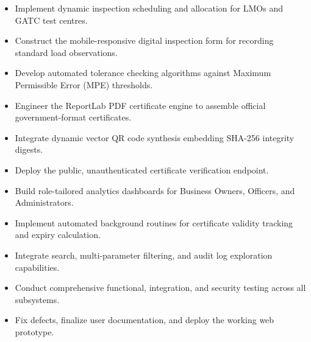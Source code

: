 \documentclass[11pt,a4paper]{article}
\begin{document}
\begin{tcolorbox}[enhanced, colback=white, colframe=primarynavy!40, boxrule=0.8pt, arc=2mm, title={\color{primarynavy}\textbf{Phase III: Verification, Scheduling \& Certification (Week 3)}}]
    \begin{itemize}
        \item Implement dynamic inspection scheduling and allocation for LMOs and GATC test centres.
        \item Construct the mobile-responsive digital inspection form for recording standard load observations.
        \item Develop automated tolerance checking algorithms against Maximum Permissible Error (MPE) thresholds.
        \item Engineer the ReportLab PDF certificate engine to assemble official government-format certificates.
        \item Integrate dynamic vector QR code synthesis embedding SHA-256 integrity digests.
        \item Deploy the public, unauthenticated certificate verification endpoint.
    \end{itemize}
\end{tcolorbox}

\begin{tcolorbox}[enhanced, colback=white, colframe=primarynavy!40, boxrule=0.8pt, arc=2mm, title={\color{primarynavy}\textbf{Phase IV: Dashboards, Notifications \& System Integration (Week 4)}}]
    \begin{itemize}
        \item Build role-tailored analytics dashboards for Business Owners, Officers, and Administrators.
        \item Implement automated background routines for certificate validity tracking and expiry calculation.
        \item Integrate search, multi-parameter filtering, and audit log exploration capabilities.
        \item Conduct comprehensive functional, integration, and security testing across all subsystems.
        \item Fix defects, finalize user documentation, and deploy the working web prototype.
    \end{itemize}
\end{tcolorbox}

\newpage

\end{document}
